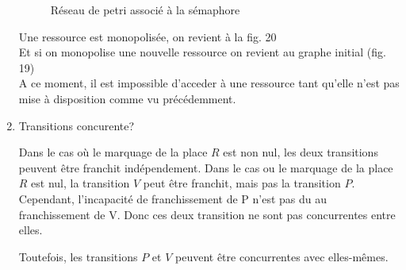 \begin{enumerate}
\begin{figure}[H]
  \caption{Réseau de petri associé à la sémaphore} \label{fig:M1}
\end{figure}

Une ressource est monopolisée, on revient à la fig. 20\\
Et si on monopolise une nouvelle ressource on revient au graphe initial (fig. 19)\\
A ce moment, il est impossible d'acceder à une ressource tant qu'elle n'est pas mise à disposition comme vu précédemment.

\item Transitions concurente?

Dans le cas où le marquage de la place $R$ est non nul, les deux transitions peuvent être franchit indépendement.
Dans le cas ou le marquage de la place $R$ est nul, la transition $V$ peut être franchit, mais pas la transition $P$.
Cependant, l'incapacité de franchissement de P n'est pas du au franchissement de V.
Donc ces deux transition ne sont pas concurrentes entre elles.

Toutefois, les transitions $P$ et $V$ peuvent être concurrentes avec elles-mêmes.



\end{enumerate}

